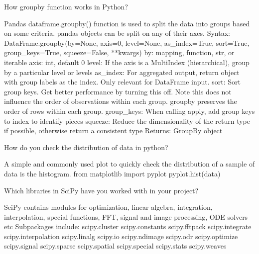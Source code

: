 	\begin{qanda}
		\begin{question}
How groupby function works in Python?
		\end{question}
		\begin{answer}
Pandas dataframe.groupby() function is used to split the data into groups based on some criteria. pandas objects can be split on any of their axes.
\newline{}Syntax: DataFrame.groupby(by=None, axis=0, level=None, as\_index=True,
\newline{}\hspace*{48pt}sort=True, group\_keys=True, squeeze=False, **kwargs)
\newline{}by: mapping, function, str, or iterable axis: int, default 0 level:
\newline{}If the axis is a MultiIndex (hierarchical), group by a particular level or levels as\_index: For aggregated output, return object with group labels as the index. Only relevant for DataFrame input. sort: Sort group keys. Get better performance by turning this off. Note this does not influence the order of observations within each group. groupby preserves the order of rows within each group. group\_keys: When calling apply, add group keys to index to identify pieces squeeze: Reduce the dimensionality of the return type if possible, otherwise return a consistent type Returns: GroupBy object
		\end{answer}
	\end{qanda}

	\begin{qanda}
		\begin{question}
How do you check the distribution of data in python?
		\end{question}
		\begin{answer}
A simple and commonly used plot to quickly check the distribution of a sample of data is the histogram. from matplotlib import pyplot pyplot.hist(data)
		\end{answer}
	\end{qanda}

	\begin{qanda}
		\begin{question}
Which libraries in SciPy have you worked with in your project?
		\end{question}
		\begin{answer}
SciPy contains modules for optimization, linear algebra, integration, interpolation, special functions, FFT, signal and image processing, ODE solvers etc Subpackages include: scipy.cluster scipy.constants scipy.fftpack scipy.integrate scipy.interpolation scipy.linalg scipy.io scipy.ndimage scipy.odr scipy.optimize scipy.signal scipy.sparse scipy.spatial scipy.special scipy.stats scipy.weaves
		\end{answer}
	\end{qanda}

